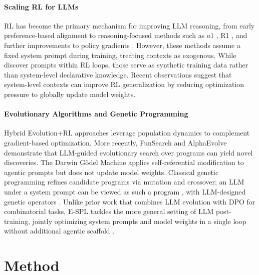 \documentclass{article}
\theoremstyle{plain}
\theoremstyle{definition}
\theoremstyle{remark}
\begin{document}
\paragraph{Scaling RL for LLMs} RL has become the primary mechanism for improving LLM reasoning, from early preference-based alignment \citep{learning-to-summarize, instructgpt} to reasoning-focused methods such as o1 \citep{o1-system-card}, R1 \citep{grpo, deepseek-r1}, and further improvements to policy gradients \citep{dapo, cispo, williams1992simple, ppo}. However, these methods assume a fixed system prompt during training, treating contexts as exogenous. While \citet{reward-guided-prompt-evolving} discover prompts within RL loops, those serve as synthetic training data rather than system-level declarative knowledge. Recent observations \citep{tan2025inoculation, azarbal2025recontextualization, macdiarmid2025natural} suggest that system-level contexts can improve RL generalization by reducing optimization pressure to globally update model weights.

\vspace{-5pt}
\paragraph{Evolutionary Algorithms and Genetic Programming} Hybrid Evolution+RL approaches \citep{erl, jaderberg2017population, cem-rl} leverage population dynamics to complement gradient-based optimization. More recently, FunSearch \citep{romera2024mathematical} and AlphaEvolve \citep{alphaevolve} demonstrate that LLM-guided evolutionary search over programs can yield novel discoveries. The Darwin Gödel Machine \citep{darwin-godel-machine} applies self-referential modification to agentic prompts but does not update model weights. Classical genetic programming \citep{koza1994genetic, langdon2013foundations} refines candidate programs via mutation and crossover; an LLM under a system prompt can be viewed as such a program \citep{gepa, alphaevolve}, with LLM-designed genetic operators \citep{hemberg2024evolving}. Unlike prior work that combines LLM evolution with DPO \citep{dpo} for combinatorial tasks, E-SPL tackles the more general setting of LLM post-training, jointly optimizing system prompts and model weights in a single loop without additional agentic scaffold \citep{ai-co-scientist}.



\section{Method}
\end{document}
